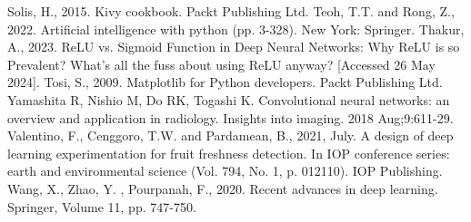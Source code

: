 \documentclass[conference]{IEEEtran}
\begin{document}
\begin{thebibliography}{00}
     Solis, H., 2015. Kivy cookbook. Packt Publishing Ltd.
     Teoh, T.T. and Rong, Z., 2022. Artificial intelligence with python (pp. 3-328). New York: Springer.
     Thakur, A., 2023. ReLU vs. Sigmoid Function in Deep Neural Networks: Why ReLU is so Prevalent? What's all the fuss about using ReLU anyway? [Accessed 26 May 2024].
     Tosi, S., 2009. Matplotlib for Python developers. Packt Publishing Ltd.
     Yamashita R, Nishio M, Do RK, Togashi K. Convolutional neural networks: an overview and application in radiology. Insights into imaging. 2018 Aug;9:611-29.
     Valentino, F., Cenggoro, T.W. and Pardamean, B., 2021, July. A design of deep learning experimentation for fruit freshness detection. In IOP conference series: earth and environmental science (Vol. 794, No. 1, p. 012110). IOP Publishing.
     Wang, X., Zhao, Y. , Pourpanah, F., 2020. Recent advances in deep
    learning. Springer, Volume 11, pp. 747-750.    

\end{thebibliography}
\end{document}
